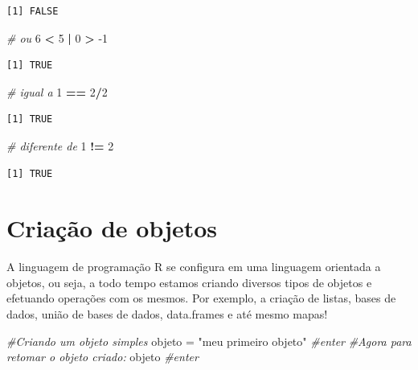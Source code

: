 \documentclass[12pt,brazil,oneside]{book}
\newenvironment{Shaded}{\begin{snugshade}}{\end{snugshade}}
\newcommand{\CommentTok}[1]{\textcolor[rgb]{0.56,0.35,0.01}{\textit{#1}}}
\newcommand{\DecValTok}[1]{\textcolor[rgb]{0.00,0.00,0.81}{#1}}
\newcommand{\NormalTok}[1]{#1}
\newcommand{\OperatorTok}[1]{\textcolor[rgb]{0.81,0.36,0.00}{\textbf{#1}}}
\newcommand{\StringTok}[1]{\textcolor[rgb]{0.31,0.60,0.02}{#1}}
\begin{document}
\begin{verbatim}
[1] FALSE
\end{verbatim}

\begin{Shaded}
\begin{Highlighting}[]
\CommentTok{# ou}
\DecValTok{6} \OperatorTok{<}\StringTok{ }\DecValTok{5} \OperatorTok{|}\StringTok{ }\DecValTok{0} \OperatorTok{>}\StringTok{ }\DecValTok{-1}
\end{Highlighting}
\end{Shaded}

\begin{verbatim}
[1] TRUE
\end{verbatim}

\begin{Shaded}
\begin{Highlighting}[]
\CommentTok{# igual a}
\DecValTok{1} \OperatorTok{==}\StringTok{ }\DecValTok{2}\OperatorTok{/}\DecValTok{2}
\end{Highlighting}
\end{Shaded}

\begin{verbatim}
[1] TRUE
\end{verbatim}

\begin{Shaded}
\begin{Highlighting}[]
\CommentTok{# diferente de}
\DecValTok{1} \OperatorTok{!=}\StringTok{ }\DecValTok{2}
\end{Highlighting}
\end{Shaded}

\begin{verbatim}
[1] TRUE
\end{verbatim}

\hypertarget{criacao-de-objetos}{%
\section{Criação de objetos}\label{criacao-de-objetos}}

A linguagem de programação R se configura em uma linguagem orientada a objetos, ou seja, a todo tempo estamos criando diversos tipos de objetos e efetuando operações com os mesmos. Por exemplo, a criação de listas, bases de dados, união de bases de dados, data.frames e até mesmo mapas!

\begin{Shaded}
\begin{Highlighting}[]
\CommentTok{#Criando um objeto simples}
\NormalTok{objeto =}\StringTok{ "meu primeiro objeto"} \CommentTok{#enter}
\CommentTok{#Agora para retomar o objeto criado:}
\NormalTok{objeto }\CommentTok{#enter}
\end{Highlighting}
\end{Shaded}
\end{document}
